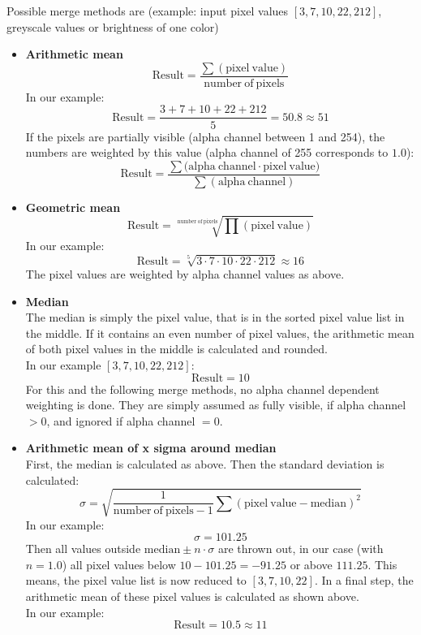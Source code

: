\documentclass[a4paper]{article}
\begin{document}
Possible merge methods are (example: input pixel values $[3,7,10,22,212]$, greyscale values or brightness of one color)
\begin{itemize}

\item \textbf{Arithmetic mean}
$$\mathrm{Result} = \frac{\sum ( \mathrm{pixel\ value} )}{\mathrm{number\ of\ pixels}}$$
In our example:
$$\mathrm{Result} = \frac{3+7+10+22+212}{5} = 50.8 \approx 51$$
If the pixels are partially visible (alpha channel between 1 and 254), the numbers are weighted by this value (alpha channel of 255 corresponds to $1.0$):
$$\mathrm{Result} = \frac{\sum ( \mathrm{alpha\ channel \cdot pixel\ value )}}{\mathrm{\sum ( alpha\ channel )}}$$

\item \textbf{Geometric mean}
$$\mathrm{Result} = \sqrt[\mathrm{number\ of\ pixels}]{\prod ( \mathrm{pixel\ value} )}$$
In our example:
$$\mathrm{Result} = \sqrt[5]{3 \cdot 7 \cdot 10 \cdot 22 \cdot 212} \approx 16$$
The pixel values are weighted by alpha channel values as above.

\item \textbf{Median} \\
The median is simply the pixel value, that is in the sorted pixel value list in the middle.
If it contains an even number of pixel values, the arithmetic mean of both pixel values in the middle is calculated and rounded. \\
In our example $[3,7,10,22,212]$:
$$\mathrm{Result} = 10$$
For this and the following merge methods, no alpha channel dependent weighting is done.
They are simply assumed as fully visible, if alpha channel $>0$, and ignored if alpha channel $=0$.

\item \textbf{Arithmetic mean of x sigma around median} \\
First, the median is calculated as above. Then the standard deviation is calculated:
$$\sigma = \sqrt{\frac{1}{\mathrm{number\ of\ pixels} - 1} \sum ( \mathrm{pixel\ value} - \mathrm{median} )^2}$$
In our example:
$$\sigma = 101.25$$
Then all values outside $\mathrm{median} \pm n \cdot \sigma$ are thrown out, in our case (with $n=1.0$) all pixel values below $10-101.25=-91.25$ or above $111.25$.
This means, the pixel value list is now reduced to $[3,7,10,22]$.
In a final step, the arithmetic mean of these pixel values is calculated as shown above. \\
In our example:
$$\mathrm{Result} = 10.5 \approx 11$$


\end{itemize}
\end{document}
